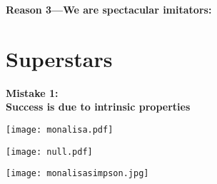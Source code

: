 



  \textbf{Reason 3---We are spectacular imitators:}
  

  \bigskip

  {\small {}}



\section{Superstars}

  \textbf{Mistake 1:\\ Success is due to intrinsic properties}

      
    \begin{center}
      \texttt{[image: monalisa.pdf]}%
    \end{center}
    
    \begin{center}
      \texttt{[image: null.pdf]}%
    \end{center}
    
    \begin{center}
      \texttt{[image: monalisasimpson.jpg]}
    \end{center}
    
